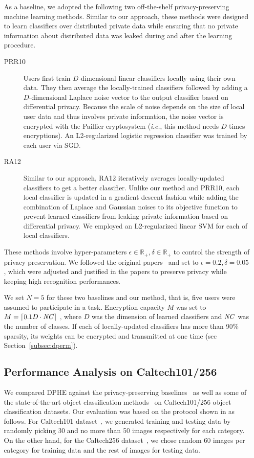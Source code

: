 \documentclass[10pt,twocolumn,letterpaper]{article}
\def\ie{{\it i.e.}}
\begin{document}
As a baseline, we adopted the following two off-the-shelf privacy-preserving machine learning methods. Similar to our approach, these methods were designed to learn classifiers over distributed private data while ensuring that no private information about distributed data was leaked during and after the learning procedure.
\begin{description}
\item[PRR10~\cite{Pathak2010a}] Users first train $D$-dimensional linear classifiers locally using their own data. They then average the locally-trained classifiers followed by adding a $D$-dimensional Laplace noise vector to the output classifier based on differential privacy. Because the scale of noise depends on the size of local user data and thus involves private information, the noise vector is encrypted with the Paillier cryptosystem (\ie, this method needs $D$-times encryptions). An L2-regularized logistic regression classifier was trained by each user via SGD.
\item[RA12~\cite{Rajkumar2012a}] Similar to our approach, RA12 iteratively averages locally-updated classifiers to get a better classifier. Unlike our method and PRR10, each local classifier is updated in a gradient descent fashion while adding the combination of Laplace and Gaussian noises to its objective function to prevent learned classifiers from leaking private information based on differential privacy. We employed an L2-regularized linear SVM for each of local classifiers.
\end{description}
These methods involve hyper-parameters $\epsilon\in\mathbb{R}_+, \delta\in\mathbb{R}_+$ to control the strength of privacy preservation. We followed the original papers~\cite{Pathak2010a,Rajkumar2012a} and set to $\epsilon=0.2, \delta=0.05$, which were adjusted and justified in the papers to preserve privacy while keeping high recognition performances. 

We set $N=5$ for these two baselines and our method, that is, five users were assumed to participate in a task. Encryption capacity $M$ was set to $M=\lceil 0.1D\cdot{\it NC}\rceil$ , where $D$ was the dimension of learned classifiers and ${\it NC}$ was the number of classes. If each of locally-updated classifiers has more than 90\% sparsity, its weights can be encrypted and transmitted at one time (see Section~\ref{subsec:dperm}).

\subsection{Performance Analysis on Caltech101/256}
\label{subsec:exp_caltech}
We compared DPHE against the privacy-preserving baselines~\cite{Pathak2010a,Rajkumar2012a} as well as some of the state-of-the-art object classification methods~\cite{He2015a,Zeiler2014a} on Caltech101/256 object classification datasets. Our evaluation was based on the protocol shown in \cite{He2015a, Zeiler2014a} as follows. For Caltech101 dataset~\cite{Fei-Fei2007a}, we generated training and testing data by randomly picking 30 and no more than 50 images respectively for each category. On the other hand, for the Caltech256 dataset~\cite{Griffin2007a}, we chose random 60 images per category for training data and the rest of images for testing data. 
\end{document}
